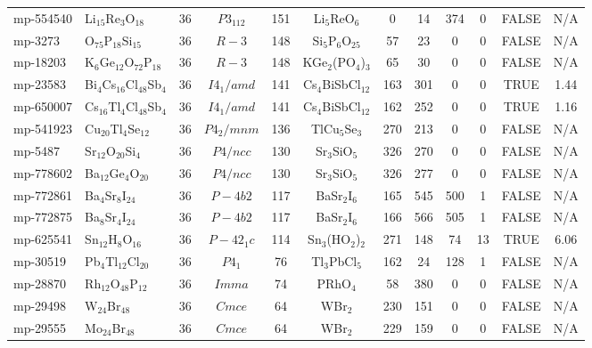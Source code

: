 {\begin{longtable}{llcccccccccc}
    mp-554540 & Li$_{15}$Re$_{3}$O$_{18}$ & 36    & $P3_112$ & 151   & Li$_{5}$ReO$_{6}$ & 0     & 14    & 374   & 0     & FALSE & N/A \\
    mp-3273 & O$_{75}$P$_{18}$Si$_{15}$ & 36    & $R-3$ & 148   & Si$_{5}$P$_{6}$O$_{25}$ & 57    & 23    & 0     & 0     & FALSE & N/A \\
    mp-18203 & K$_{6}$Ge$_{12}$O$_{72}$P$_{18}$ & 36    & $R-3$ & 148   & KGe$_{2}$(PO$_{4}$)$_{3}$ & 65    & 30    & 0     & 0     & FALSE & N/A \\
    mp-23583 & Bi$_{4}$Cs$_{16}$Cl$_{48}$Sb$_{4}$ & 36    & $I4_1/amd$ & 141   & Cs$_{4}$BiSbCl$_{12}$ & 163   & 301   & 0     & 0     & TRUE  & 1.44  \\
    mp-650007 & Cs$_{16}$Tl$_{4}$Cl$_{48}$Sb$_{4}$ & 36    & $I4_1/amd$ & 141   & Cs$_{4}$BiSbCl$_{12}$ & 162   & 252   & 0     & 0     & TRUE  & 1.16  \\
    mp-541923 & Cu$_{20}$Tl$_{4}$Se$_{12}$ & 36    & $P4_2/mnm$ & 136   & TlCu$_{5}$Se$_{3}$ & 270   & 213   & 0     & 0     & FALSE & N/A \\
    mp-5487 & Sr$_{12}$O$_{20}$Si$_{4}$ & 36    & $P4/ncc$ & 130   & Sr$_{3}$SiO$_{5}$ & 326   & 270   & 0     & 0     & FALSE & N/A \\
    mp-778602 & Ba$_{12}$Ge$_{4}$O$_{20}$ & 36    & $P4/ncc$ & 130   & Sr$_{3}$SiO$_{5}$ & 326   & 277   & 0     & 0     & FALSE & N/A \\
    mp-772861 & Ba$_{4}$Sr$_{8}$I$_{24}$ & 36    & $P-4b2$ & 117   & BaSr$_{2}$I$_{6}$ & 165   & 545   & 500   & 1     & FALSE & N/A \\
    mp-772875 & Ba$_{8}$Sr$_{4}$I$_{24}$ & 36    & $P-4b2$ & 117   & BaSr$_{2}$I$_{6}$ & 166   & 566   & 505   & 1     & FALSE & N/A \\
    mp-625541 & Sn$_{12}$H$_{8}$O$_{16}$ & 36    & $P-42_1c$ & 114   & Sn$_{3}$(HO$_{2}$)$_{2}$ & 271   & 148   & 74    & 13    & TRUE  & 6.06  \\
    mp-30519 & Pb$_{4}$Tl$_{12}$Cl$_{20}$ & 36    & $P4_1$ & 76    & Tl$_{3}$PbCl$_{5}$ & 162   & 24    & 128   & 1     & FALSE & N/A \\
    mp-28870 & Rh$_{12}$O$_{48}$P$_{12}$ & 36    & $Imma$ & 74    & PRhO$_{4}$ & 58    & 380   & 0     & 0     & FALSE & N/A \\
    mp-29498 & W$_{24}$Br$_{48}$ & 36    & $Cmce$ & 64    & WBr$_{2}$ & 230   & 151   & 0     & 0     & FALSE & N/A \\
    mp-29555 & Mo$_{24}$Br$_{48}$ & 36    & $Cmce$ & 64    & WBr$_{2}$ & 229   & 159   & 0     & 0     & FALSE & N/A \\

\end{longtable}}
